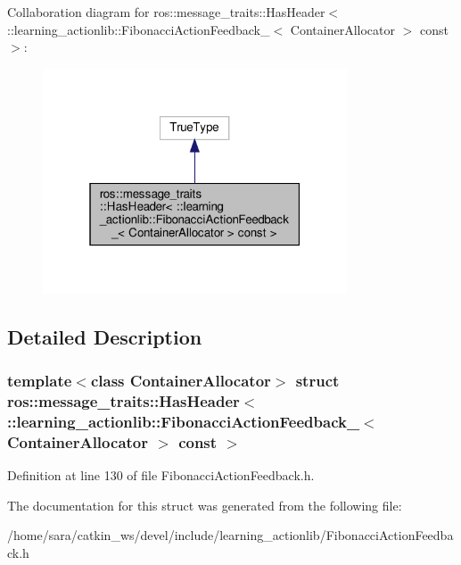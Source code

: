 Collaboration diagram for ros\+:\+:message\+\_\+traits\+:\+:Has\+Header$<$ \+:\+:learning\+\_\+actionlib\+:\+:Fibonacci\+Action\+Feedback\+\_\+$<$ Container\+Allocator $>$ const $>$\+:
\nopagebreak
\begin{figure}[H]
\begin{center}
\leavevmode
\includegraphics[width=256pt]{structros_1_1message__traits_1_1HasHeader_3_01_1_1learning__actionlib_1_1FibonacciActionFeedback0cbe48511d9a8b123bd839f1ed1439a1}
\end{center}
\end{figure}


\subsection{Detailed Description}
\subsubsection*{template$<$class Container\+Allocator$>$\newline
struct ros\+::message\+\_\+traits\+::\+Has\+Header$<$ \+::learning\+\_\+actionlib\+::\+Fibonacci\+Action\+Feedback\+\_\+$<$ Container\+Allocator $>$ const $>$}



Definition at line 130 of file Fibonacci\+Action\+Feedback.\+h.



The documentation for this struct was generated from the following file\+:\begin{DoxyCompactItemize}
\item 
/home/sara/catkin\+\_\+ws/devel/include/learning\+\_\+actionlib/Fibonacci\+Action\+Feedback.\+h\end{DoxyCompactItemize}
